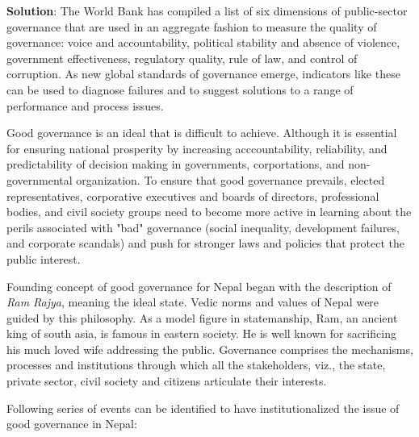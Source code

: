 \documentclass[
]{book}
\newenvironment{solution}{ {\bfseries Solution}:}{}
\begin{document}
\begin{questions}
\begin{solution}
The World Bank has compiled a list of six dimensions of public-sector governance that are used in an aggregate fashion to measure the quality of governance: voice and accountability, political stability and absence of violence, government effectiveness, regulatory quality, rule of law, and control of corruption. As new global standards of governance emerge, indicators like these can be used to diagnose failures and to suggest solutions to a range of performance and process issues.

Good governance is an ideal that is difficult to achieve. Although it is essential for ensuring national prosperity by increasing acccountability, reliability, and predictability of decision making in governments, corportations, and non-governmental organization. To ensure that good governance prevails, elected representatives, corporative executives and boards of directors, professional bodies, and civil society groups need to become more active in learning about the perils associated with "bad" governance (social inequality, development failures, and corporate scandals) and push for stronger laws and policies that protect the public interest.

Founding concept of good governance for Nepal began with the description of \textit{Ram Rajya}, meaning the ideal state. Vedic norms and values of Nepal were guided by this philosophy. As a model figure in statemanship, Ram, an ancient king of south asia, is famous in eastern society. He is well known for sacrificing his much loved wife addressing the public. Governance comprises the mechanisms, processes and institutions through which all the stakeholders, viz., the state, private sector, civil society and citizens articulate their interests.

Following series of events can be identified to have institutionalized the issue of good governance in Nepal:


\end{solution}
\end{questions}
\end{document}
